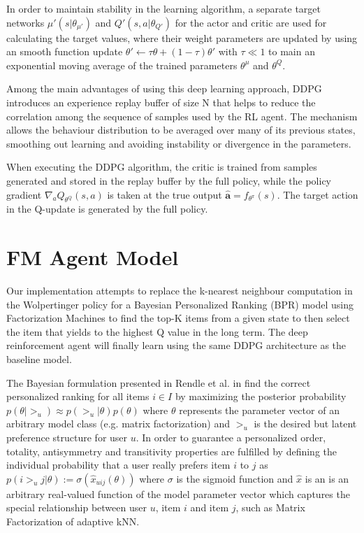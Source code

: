 In order to maintain stability in the learning algorithm, a separate target networks $\mu'(s|\theta_{\mu'})$ and $Q'(s, a|\theta_{Q'})$ for the actor and critic are used for calculating the target values, where their weight parameters are updated by using an smooth function update $\theta' \leftarrow \tau\theta + (1 - \tau)\theta'$ with $\tau \ll 1$ to main an exponential moving average of the trained parameters $\theta^{\mu}$ and $\theta^{Q}$.
 
Among the main advantages of using this deep learning approach, DDPG introduces an experience replay buffer of size N that helps to reduce the correlation among the sequence of samples used by the RL agent. The mechanism allows the behaviour distribution to be averaged over many of its previous states, smoothing out learning and avoiding instability or divergence in the parameters.

When executing the DDPG algorithm, the critic is trained from samples generated and stored in the replay buffer by the full policy, while the policy gradient $\nabla_a Q_{\theta^Q}(s,a)$ is taken at the true output $\hat{\mathbf{a}} = f_{\theta^{\pi}}(s)$. The target action in the Q-update is generated by the full policy.

\section{FM Agent Model}

Our implementation attempts to replace the k-nearest neighbour computation in the Wolpertinger policy for a Bayesian Personalized Ranking (BPR) model using Factorization Machines to find the top-K items from a given state to then select the item that yields to the highest Q value in the long term. The deep reinforcement agent will finally learn using the same DDPG architecture as the baseline model.

The Bayesian formulation presented in Rendle et al. in \cite{rendle2009bpr} find the correct personalized  ranking  for  all  items $i \in I$ by maximizing the posterior probability $p(\theta | >_u) \approx p(>_u | \theta) p(\theta)$ where $\theta$ represents the parameter vector of an arbitrary model class (e.g. matrix factorization) and $>_u$ is the desired but latent preference structure for user $u$. In order to guarantee a personalized order, totality, antisymmetry and transitivity properties are fulfilled by defining the individual probability that a user really prefers item $i$ to $j$ as $p(i >_u j | \theta ) := \sigma(\hat{x}_{uij}(\theta))$ where $\sigma$ is the sigmoid function and $\hat{x}$ is an is  an  arbitrary  real-valued  function of the model parameter vector which captures the special relationship between user $u$, item $i$ and item $j$, such as Matrix Factorization of adaptive kNN.

